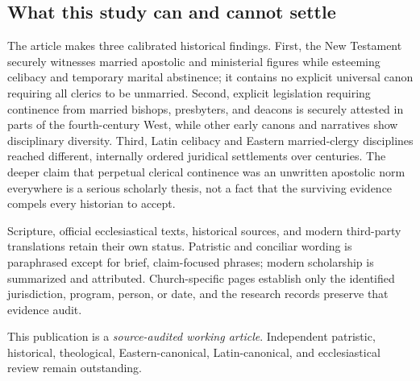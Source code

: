 {\subsection{What this study can and cannot settle}

The article makes three calibrated historical findings. First, the New Testament securely witnesses married apostolic and ministerial figures while esteeming celibacy and temporary marital abstinence; it contains no explicit universal canon requiring all clerics to be unmarried. Second, explicit legislation requiring continence from married bishops, presbyters, and deacons is securely attested in parts of the fourth-century West, while other early canons and narratives show disciplinary diversity. Third, Latin celibacy and Eastern married-clergy disciplines reached different, internally ordered juridical settlements over centuries. The deeper claim that perpetual clerical continence was an unwritten apostolic norm everywhere is a serious scholarly thesis, not a fact that the surviving evidence compels every historian to accept.

Scripture, official ecclesiastical texts, historical sources, and modern third-party translations retain their own status. Patristic and conciliar wording is paraphrased except for brief, claim-focused phrases; modern scholarship is summarized and attributed. Church-specific pages establish only the identified jurisdiction, program, person, or date, and the research records preserve that evidence audit.

This publication is a \emph{source-audited working article}. Independent patristic, historical, theological, Eastern-canonical, Latin-canonical, and ecclesiastical review remain outstanding.
}
